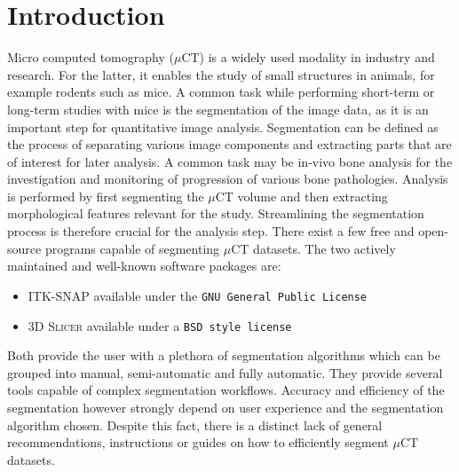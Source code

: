 \clearpage
\section{Introduction}
\begin{body}
	Micro computed tomography ($\mu$CT) is a widely used modality in industry and research. For the latter, it enables the study of small structures in animals, for example rodents such as mice\cite{percianoInsight3DMicroCT2017}.
	A common task while performing short-term or long-term studies with mice is the segmentation of the image data, as it is an important step for quantitative image analysis\cite{sheppardTechniquesHelicalScanning2014}. Segmentation can be defined as the process of separating various image components and extracting parts that are of interest for later analysis\cite{percianoInsight3DMicroCT2017}. A common task may be in-vivo bone analysis for the investigation and monitoring of progression of various bone pathologies. Analysis is performed by first segmenting the $\mu$CT volume and then extracting morphological features relevant for the study. Streamlining the segmentation process is therefore crucial for the analysis step\cite{korfiatisIndependentActiveContours2017}.
	\newline
	There exist a few free and open-source programs capable of segmenting $\mu$CT datasets.
	The two actively maintained and well-known\cite{mandoliniComparisonThree3D2022,virziComprehensiveReview3D2020} software packages are:
	\begin{itemize}
		\item \textsc{ITK-SNAP}\cite{yushkevichUserguided3DActive2006} available under the \texttt{GNU General Public License}\cite{licenseGnuGeneralPublic1989}
		\item \textsc{3D Slicer}\cite{kikinis3DSlicerPlatform2014} available under a \texttt{BSD style license}\cite{gaudeulPublicProvisionPrivate2005}
	\end{itemize}
	Both provide the user with a plethora of segmentation algorithms which can be grouped into manual, semi-automatic and fully automatic. They provide several tools capable of complex segmentation workflows\cite{percianoInsight3DMicroCT2017}.
	Accuracy and efficiency of the segmentation however strongly depend on user experience and the segmentation algorithm chosen\cite{mandoliniComparisonThree3D2022,aydinRELIABILITYREPRODUCIBILITYTIMEEFFICIENCY2020}. Despite this fact, there is a distinct lack of general recommendations, instructions or guides on how to efficiently segment $\mu$CT datasets.\\

\end{body}
